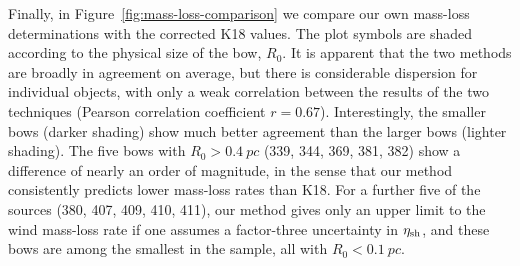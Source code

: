 Finally, in Figure~\ref{fig:mass-loss-comparison} we compare our own
mass-loss determinations with the corrected K18 values.  The plot
symbols are shaded according to the physical size of the bow, \(R_0\).
It is apparent that the two methods are broadly in agreement on
average, but there is considerable dispersion for individual objects,
with only a weak correlation between the results of the two techniques
(Pearson correlation coefficient \(r = 0.67\)).  Interestingly, the
smaller bows (darker shading) show much better agreement than the
larger bows (lighter shading).  The five bows with
\(R_0 > \SI{0.4}{pc}\) (339, 344, 369, 381, 382) show a difference of
nearly an order of magnitude, in the sense that our method
consistently predicts lower mass-loss rates than K18.  For a further
five of the sources (380, 407, 409, 410, 411), our method gives only
an upper limit to the wind mass-loss rate if one assumes a
factor-three uncertainty in \(\eta_{\text{sh}}\), and these bows are among
the smallest in the sample, all with \(R_0 < \SI{0.1}{pc}\).






